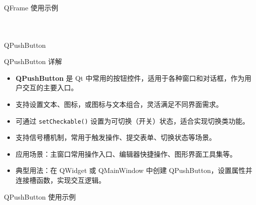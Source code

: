 \documentclass[UTF8,aspectratio=169]{beamer}
\begin{document}
\begin{frame}[fragile]{QFrame 使用示例}
    \begin{columns}
        \begin{column}{0.48\textwidth}
            \inputminted[firstline=1,lastline=17]{cpp}{code/qt_frame_example.cpp}
        \end{column}
        \begin{column}{0.48\textwidth}
            \inputminted[firstline=18,lastline=34]{cpp}{code/qt_frame_example.cpp}
        \end{column}
    \end{columns}
\end{frame}

\begin{frame}{QPushButton}
    \begin{ytublock}{QPushButton 详解}
        \begin{itemize}
            \item \textbf{QPushButton} 是 Qt 中常用的按钮控件，适用于各种窗口和对话框，作为用户交互的主要入口。
            \item 支持设置文本、图标，或图标与文本组合，灵活满足不同界面需求。
            \item 可通过 \texttt{setCheckable()} 设置为可切换（开关）状态，适合实现切换类功能。
            \item 支持信号槽机制，常用于触发操作、提交表单、切换状态等场景。
            \item 应用场景：主窗口常用操作入口、编辑器快捷操作、图形界面工具集等。
            \item 典型用法：在 QWidget 或 QMainWindow 中创建 QPushButton，设置属性并连接槽函数，实现交互逻辑。
        \end{itemize}
    \end{ytublock}
\end{frame}

\begin{frame}[fragile]{QPushButton 使用示例}
    \begin{columns}
        \begin{column}{0.48\textwidth}
            \inputminted[firstline=1,lastline=17]{cpp}{code/qt_pushbutton_example.cpp}
        \end{column}
        \begin{column}{0.48\textwidth}
            \inputminted[firstline=18,lastline=34]{cpp}{code/qt_pushbutton_example.cpp}
        \end{column}
    \end{columns}
\end{frame}
\end{document}
